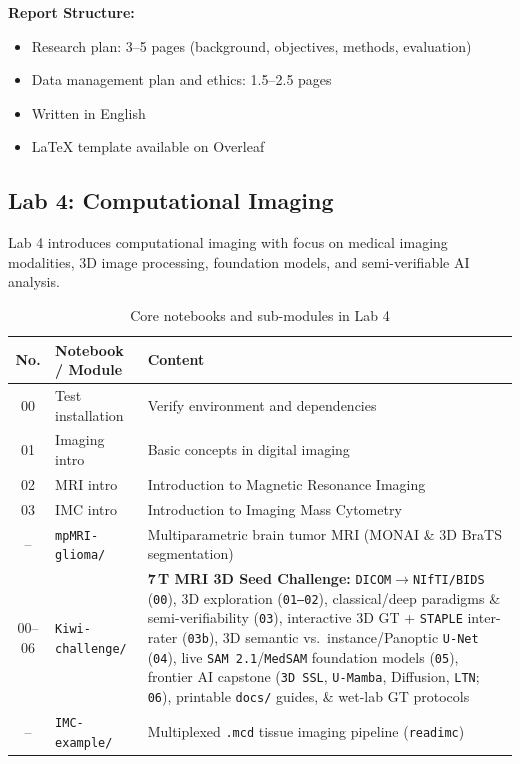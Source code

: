 \documentclass[11pt,a4paper]{article}
\begin{document}
\textbf{Report Structure:}
\begin{itemize}[nosep]
    \item Research plan: 3--5 pages (background, objectives, methods, evaluation)
    \item Data management plan and ethics: 1.5--2.5 pages
    \item Written in English
    \item LaTeX template available on Overleaf
\end{itemize}

\subsection{Lab 4: Computational Imaging}

Lab 4 introduces computational imaging with focus on medical imaging modalities, 3D image processing, foundation models, and semi-verifiable AI analysis.

\begin{table}[htbp]
\centering
\caption{Core notebooks and sub-modules in Lab 4}
\label{tab:lab4}
\begin{tabular}{@{}clp{7.2cm}@{}}
\toprule
\textbf{No.} & \textbf{Notebook / Module} & \textbf{Content} \\
\midrule
00 & Test installation & Verify environment and dependencies \\
01 & Imaging intro & Basic concepts in digital imaging \\
02 & MRI intro & Introduction to Magnetic Resonance Imaging \\
03 & IMC intro & Introduction to Imaging Mass Cytometry \\
\midrule
-- & \texttt{mpMRI-glioma/} & Multiparametric brain tumor MRI (MONAI \& 3D BraTS segmentation) \\
00--06 & \texttt{Kiwi-challenge/} & \textbf{7\,T MRI 3D Seed Challenge:} \texttt{DICOM$\to$NIfTI/BIDS} (\texttt{00}), 3D exploration (\texttt{01--02}), classical/deep paradigms \& semi-verifiability (\texttt{03}), interactive 3D GT + \texttt{STAPLE} inter-rater (\texttt{03b}), 3D semantic vs.\ instance/Panoptic \texttt{U-Net} (\texttt{04}), live \texttt{SAM\,2.1}/\texttt{MedSAM} foundation models (\texttt{05}), frontier AI capstone (\texttt{3D SSL}, \texttt{U-Mamba}, Diffusion, \texttt{LTN}; \texttt{06}), printable \texttt{docs/} guides, \& wet-lab GT protocols \\
-- & \texttt{IMC-example/} & Multiplexed \texttt{.mcd} tissue imaging pipeline (\texttt{readimc}) \\
\bottomrule
\end{tabular}
\end{table}
\end{document}
